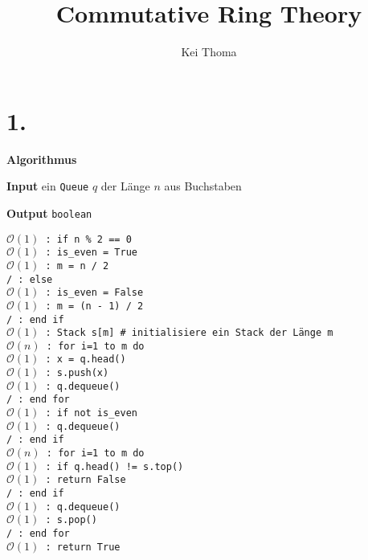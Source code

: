 \documentclass[a4paper]{book}
\title{Commutative Ring Theory}
\author{Kei Thoma}
\theoremstyle{definition}
\begin{document}
\section*{1.}
\textbf{Algorithmus}

\noindent\textbf{Input} ein \texttt{Queue} \(q\) der Länge \(n\) aus Buchstaben

\noindent\textbf{Output} \texttt{boolean}

\noindent\texttt{\(\mathcal{O}(1)\) : if n \% 2 == 0 \\
\(\mathcal{O}(1)\) : \indent is\_even = True \\
\(\mathcal{O}(1)\) : \indent m = n / 2 \\
/ \indent {}: else \\
\(\mathcal{O}(1)\) : \indent is\_even = False \\
\(\mathcal{O}(1)\) : \indent m = (n - 1) / 2 \\
/ \indent {}: end if \\
\(\mathcal{O}(1)\) : Stack s[m] \# initialisiere ein Stack der Länge m \\
\(\mathcal{O}(n)\) : for i=1 to m do \\
\(\mathcal{O}(1)\) : \indent x = q.head() \\
\(\mathcal{O}(1)\) : \indent s.push(x) \\
\(\mathcal{O}(1)\) : \indent q.dequeue() \\
/ \indent {}: end for \\
\(\mathcal{O}(1)\) : if not is\_even \\
\(\mathcal{O}(1)\) : \indent q.dequeue() \\
/ \indent {}: end if \\
\(\mathcal{O}(n)\) : for i=1 to m do \\
\(\mathcal{O}(1)\) : \indent if q.head() != s.top() \\
\(\mathcal{O}(1)\) : \indent \indent return False \\
/ \indent {}: \indent end if \\
\(\mathcal{O}(1)\) : \indent q.dequeue() \\
\(\mathcal{O}(1)\) : \indent s.pop()\\
/ \indent {}: end for \\
\(\mathcal{O}(1)\) : return True}
\end{document}
